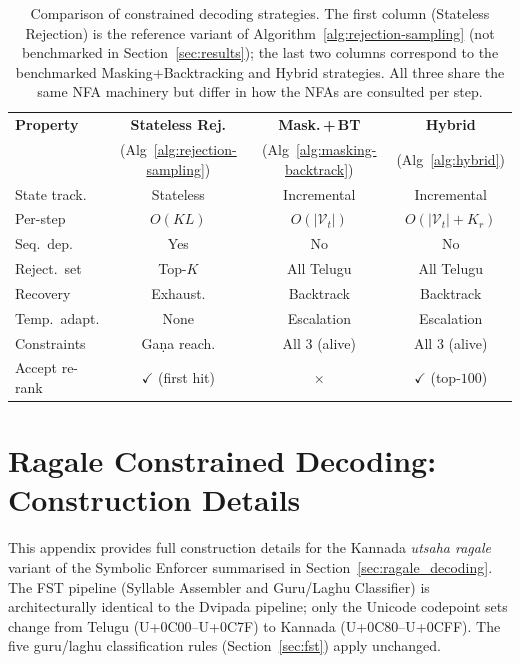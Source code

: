 \documentclass[11pt]{article}
\begin{document}
\begin{table}[H]
\centering
\scriptsize
\caption{Comparison of constrained decoding strategies. The
first column (Stateless Rejection) is the reference variant of
Algorithm~\ref{alg:rejection-sampling} (not benchmarked in
Section~\ref{sec:results}); the last two columns correspond to the
benchmarked Masking+Backtracking and Hybrid strategies. All three
share the same NFA machinery but differ in how the NFAs are consulted
per step.}
\label{tab:strategy-comparison}
\begin{tabular}{lccc}
\toprule
\textbf{Property}
    & \textbf{Stateless Rej.}
    & \textbf{Mask.\,+\,BT}
    & \textbf{Hybrid} \\
    & (Alg~\ref{alg:rejection-sampling})
    & (Alg~\ref{alg:masking-backtrack})
    & (Alg~\ref{alg:hybrid}) \\
\midrule
State track.
    & Stateless
    & Incremental
    & Incremental \\
Per-step
    & $O(KL)$
    & $O(|\mathcal{V}_t|)$
    & $O(|\mathcal{V}_t|{+}K_r)$ \\
Seq.\ dep.
    & Yes
    & No
    & No \\
Reject.\ set
    & Top-$K$
    & All Telugu
    & All Telugu \\
Recovery
    & Exhaust.
    & Backtrack
    & Backtrack \\
Temp.\ adapt.
    & None
    & Escalation
    & Escalation \\
Constraints
    & Ga\d{n}a reach.
    & All 3 (alive)
    & All 3 (alive) \\
Accept re-rank
    & $\checkmark$ (first hit)
    & $\times$
    & $\checkmark$ (top-$100$) \\
\bottomrule
\end{tabular}
\end{table}


\section{Ragale Constrained Decoding: Construction Details}
\label{app:ragale_construction}

This appendix provides full construction details for the Kannada
\textit{utsaha ragale} variant of the Symbolic Enforcer summarised in
Section~\ref{sec:ragale_decoding}. The FST pipeline (Syllable Assembler
and Guru/Laghu Classifier) is architecturally identical to the Dvipada
pipeline; only the Unicode codepoint sets change from Telugu
(U+0C00--U+0C7F) to Kannada (U+0C80--U+0CFF). The five
guru/laghu classification rules (Section~\ref{sec:fst}) apply unchanged.
\end{document}
